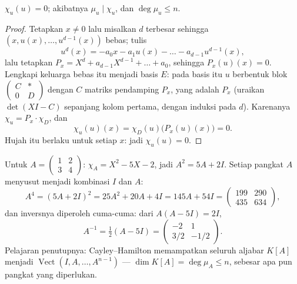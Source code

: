 \begin{theorem}\label{thm:b2:reduction:cayleyhamilton}
$\chi_u(u) = 0$; akibatnya $\mu_u \mid \chi_u$, dan $\deg \mu_u
\leq n$.
\end{theorem}

\begin{proof}
Tetapkan $x \neq 0$ lalu misalkan $d$ terbesar sehingga $(x, u(x), \dots,
u^{d-1}(x))$ bebas; tulis
\[
u^d(x) = -a_0 x - a_1 u(x) - \dots - a_{d-1}u^{d-1}(x),
\]
lalu tetapkan $P_x = X^d + a_{d-1}X^{d-1} + \dots + a_0$, sehingga
$P_x(u)(x) = 0$. Lengkapi keluarga bebas itu menjadi basis $E$: pada
basis itu $u$ berbentuk blok $\begin{pmatrix} C & \ast\\ 0 & D\end{pmatrix}$
dengan $C$ matriks pendamping $P_x$, yang 
adalah $P_x$ (uraikan $\det(XI - C)$ sepanjang kolom pertama, dengan
induksi pada $d$). Karenanya $\chi_u = P_x \cdot \chi_D$, dan
\[
\chi_u(u)(x) = \chi_D(u)\bigl(P_x(u)(x)\bigr) = 0 .
\]
Hujah itu berlaku untuk setiap $x$: jadi $\chi_u(u) = 0$.
\end{proof}

\begin{example}\label{ex:b2:reduction:chwork}
Untuk $A = \begin{pmatrix} 1 & 2\\ 3 & 4\end{pmatrix}$: $\chi_A = X^2 -
5X - 2$, jadi $A^2 = 5A + 2I$. Setiap pangkat $A$ menyusut menjadi
kombinasi $I$ dan $A$:
\[
A^4 = (5A + 2I)^2 = 25A^2 + 20A + 4I = 145A + 54I =
\begin{pmatrix} 199 & 290\\ 435 & 634\end{pmatrix},
\]
dan inversnya diperoleh cuma-cuma: dari $A(A - 5I) = 2I$,
\[
A^{-1} = \tfrac12(A - 5I)
= \begin{pmatrix} -2 & 1\\ 3/2 & -1/2\end{pmatrix}.
\]
Pelajaran penutupnya: Cayley--Hamilton memampatkan seluruh aljabar
$K[A]$ menjadi $\operatorname{Vect}(I, A, \dots, A^{n-1})$ ---
$\dim K[A] = \deg\mu_A \leq n$, sebesar apa pun pangkat yang diperlukan.
\end{example}

